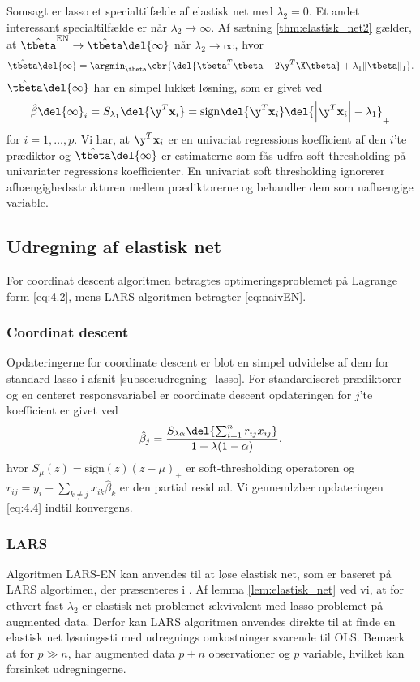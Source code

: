 Somsagt er lasso et specialtilfælde af elastisk net med \(\lambda_2=0\). 
Et andet interessant specialtilfælde er når \(\lambda_2 \rightarrow \infty\).
Af sætning \ref{thm:elastisk_net2} gælder, at \(\hat{\tbeta}^\text{EN} \rightarrow \hat{\tbeta} \del{\infty}\) når \(\lambda_2 \rightarrow \infty\), hvor
\begin{align*}
\hat{\tbeta} \del{\infty} = \argmin_{\tbeta} \cbr{ \del{\tbeta^T \tbeta - 2 \y^T \X \tbeta} + \lambda_1 \Vert \tbeta \Vert_1}.
\end{align*}
\(\hat{\tbeta} \del{\infty}\) har en simpel lukket løsning, som er givet ved
\begin{align*}
\hat{\beta} \del{\infty}_i = S_{\lambda_1} \del{\y^T \mathbf{x}_i}=\text{sign} \del{\y^T \mathbf{x}_i} \del{\left\vert \y^T \mathbf{x}_i \right\vert - \lambda_1}_+
\end{align*}
for \(i = 1, \ldots, p\).
Vi har, at \(\y^T \mathbf{x}_i\) er en univariat regressions koefficient af den \(i\)'te prædiktor og \(\hat{\tbeta} \del{\infty}\) er estimaterne som fås udfra soft thresholding på univariater regressions koefficienter.
En univariat soft thresholding ignorerer afhængighedsstrukturen mellem prædiktorerne og behandler dem som uafhængige variable.
%
\subsection{Udregning af elastisk net}
For coordinat descent algoritmen betragtes optimeringsproblemet på Lagrange form \eqref{eq:4.2}, mens LARS algoritmen betragter \eqref{eq:naivEN}.
%
\subsubsection{Coordinat descent}
Opdateringerne for coordinate descent er blot en simpel udvidelse af dem for standard lasso i afsnit \ref{subsec:udregning_lasso}.
For standardiseret prædiktorer og en centeret responsvariabel er coordinate descent opdateringen for $j$'te koefficient er givet ved
\begin{align}
\hat{\beta}_j = \frac{S_{\lambda \alpha} \del{\sum_{i=1}^n r_{ij} x_{ij}}}{1 + \lambda (1-\alpha)}, \label{eq:4.4}
\end{align}
hvor $S_\mu(z)=\text{sign}(z)(z-\mu)_+$ er soft-thresholding operatoren og $r_{ij}=y_i - \sum_{k \neq j} x_{ik} \hat{\beta}_k$ er den partial residual. 
Vi gennemløber opdateringen \eqref{eq:4.4} indtil konvergens.
%
\subsubsection{LARS}
Algoritmen LARS-EN kan anvendes til at løse elastisk net, som er baseret på LARS algortimen, der præsenteres i \cite{efron}.
Af lemma \ref{lem:elastisk_net} ved vi, at for ethvert fast \(\lambda_2\) er elastisk net problemet ækvivalent med lasso problemet på augmented data.
Derfor kan LARS algoritmen anvendes direkte til at finde en elastisk net løsningssti med udregnings omkostninger svarende til OLS.
Bemærk at for \(p \gg n\), har augmented data \(p+n\) observationer og \(p\) variable, hvilket kan forsinket udregningerne.

